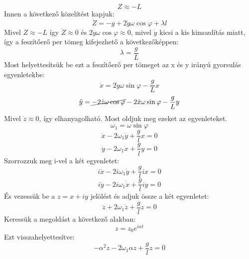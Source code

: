 \documentclass[a4paper,12pt]{article}
\begin{document}
\begin{equation}
    Z \approx -L
\end{equation}
Innen a következő közelítést kapjuk:
\begin{equation}
    \ddot{Z} = -g + 2\dot{y}\omega\cos\varphi + \lambda l
\end{equation}
Mivel $Z \approx -L$ így $\ddot{Z} \approx 0$ és $2\dot{y}\omega\cos\varphi \approx 0$, mivel $\dot{y}$ kicsi a kis kimozdítás miatt, így a feszítőerő per tömeg kifejezhető a következőképpen:
\begin{equation}
    \lambda = \frac{g}{L}
\end{equation}
Most helyettesítsük be ezt a feszítőerő per tömeget az x és y irányú gyorsulás egyenletekbe:
\begin{equation}
    \ddot{x} = 2\dot{y}\omega\sin\varphi - \frac{g}{L}x
\end{equation}
\begin{equation}
    \ddot{y} = \cancel{-2\dot{z}\omega\cos\varphi} - 2\dot{x}\omega\sin\varphi - \frac{g}{L}y
\end{equation}
Mivel $\dot{z} \approx 0$, így elhanyagolható. Most oldjuk meg ezeket az egyenleteket. 
\begin{equation}
    \omega_1 = \omega \sin \varphi
\end{equation}
\begin{equation}
    \ddot{x} - 2 \omega_1 \dot{y} + \frac{g}{l} x = 0
\end{equation}
\begin{equation}
    \ddot{y} - 2 \omega_1 \dot{x} + \frac{g}{l} y = 0
\end{equation}
Szorrozzuk meg i-vel a két egyenletet:
\begin{equation}
   i \ddot{x} - 2i \omega_1 \dot{y} + \frac{g}{l} ix = 0
\end{equation}
\begin{equation}
   i \ddot{y} - 2i \omega_1 \dot{x} + \frac{g}{l} iy = 0
\end{equation}
És vezessük be a $z = x + iy$ jelölést és adjuk össze a két egyenletet:
\begin{equation}
    \ddot{z} + 2 \omega_1 \dot{z} + \frac{g}{l} z = 0
\end{equation}
Keressük a megoldást a következő alakban:
\begin{equation}
    z = z_0 e^{i  \alpha t}
\end{equation}
Ezt visszahelyettesítve:
\begin{equation}
    - \alpha^2 z - 2 \omega_1 \alpha z + \frac{g}{l} z = 0
\end{equation}
\end{document}
